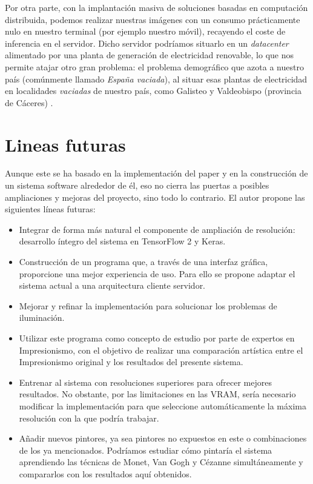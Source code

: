 \documentclass[../main.tex]{subfiles}
\begin{document}
Por otra parte, con la implantación masiva de soluciones basadas en computación distribuida, podemos realizar nuestras imágenes con un consumo prácticamente nulo en nuestro terminal (por ejemplo nuestro móvil), recayendo el coste de inferencia en el servidor. Dicho servidor podríamos situarlo en un \textit{datacenter} alimentado por una planta de generación de electricidad renovable, lo que nos permite atajar otro gran problema: el problema demográfico que azota a nuestro país (comúnmente llamado \textit{España vaciada}),  al situar esas plantas de electricidad en localidades \textit{vaciadas} de nuestro país, como Galisteo y Valdeobispo (provincia de Cáceres) \cite{ElPeriodicodelaEnergia2018}.

\newpage

\section{Lineas futuras}
Aunque este \tfg se ha basado en la implementación del paper \cite{Zhu2017} y en la construcción de un sistema software alrededor de él, eso no cierra las puertas a posibles ampliaciones y mejoras del proyecto, sino todo lo contrario. El autor propone las siguientes líneas futuras:

\begin{itemize}
    \item Integrar de forma más natural el componente de ampliación de resolución: desarrollo íntegro del sistema en TensorFlow 2 y Keras.
    \item Construcción de un programa que, a través de una interfaz gráfica, proporcione una mejor experiencia de uso. Para ello se propone adaptar el sistema actual a una arquitectura cliente servidor.
    \item Mejorar y refinar la implementación para solucionar los problemas de iluminación.
    \item Utilizar este programa como concepto de estudio por parte de expertos en Impresionismo, con el objetivo de realizar una comparación artística entre el Impresionismo original y los resultados del presente sistema.
    \item Entrenar al sistema con resoluciones superiores para ofrecer mejores resultados. No obstante, por las limitaciones en las VRAM, sería necesario modificar la implementación para que seleccione automáticamente la máxima resolución con la que podría trabajar.
    \item Añadir nuevos pintores, ya sea pintores no expuestos en este \tfg o combinaciones de los ya mencionados. Podríamos estudiar cómo pintaría el sistema aprendiendo las técnicas de Monet, Van Gogh y Cézanne simultáneamente y compararlos con los resultados aquí obtenidos.
\end{itemize}
\end{document}
